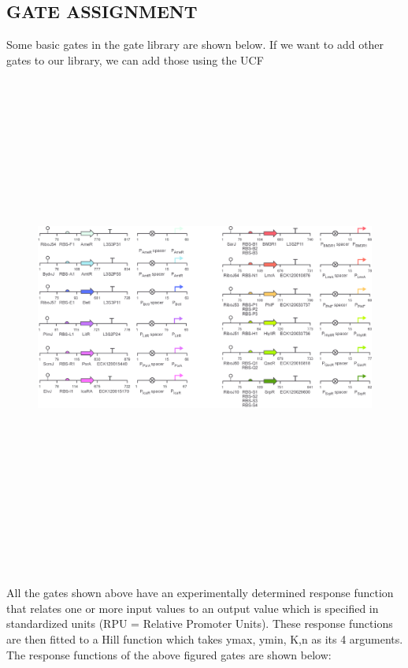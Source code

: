 \documentclass[11pt]{article}
\begin{document}
\subsection*{GATE ASSIGNMENT}
Some basic gates in the gate library are shown below. If we want to add other gates to our library, we can add those using the UCF
\begin{figure}[ht!]
\centering
\includegraphics[width=16cm,height=16cm,keepaspectratio]{gate.png}
\label{Gate Library}
\end{figure}
\\[\baselineskip]    
All the gates shown above have an experimentally determined response function that relates one or more input values to an output value which is specified in standardized units (RPU = Relative Promoter Units). These response functions are then fitted to a Hill function which takes ymax, ymin, K,n as its 4 arguments.
The response functions of the above figured gates are shown below: 
\end{document}
